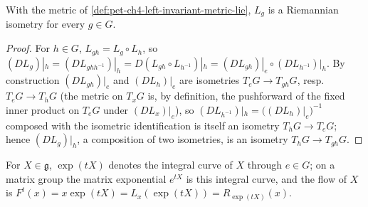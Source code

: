 \begin{proposition}
  \label{prop:pet-ch4-left-translation-isometry}
  \leanok
  With the metric of \cref{def:pet-ch4-left-invariant-metric-lie}, $L_g$ is a
  Riemannian isometry for every $g\in G$.
\end{proposition}
\begin{proof}
  \leanok
  For $h\in G$, $L_{gh}=L_g\circ L_h$, so
  $(DL_g)|_h=(DL_{ghh^{-1}})|_h=D(L_{gh}\circ L_{h^{-1}})|_h=(DL_{gh})|_e\circ(DL_{h^{-1}})|_h$.
  By construction $(DL_{gh})|_e$ and $(DL_h)|_e$ are isometries $T_eG\to T_{gh}G$,
  resp.\ $T_eG\to T_hG$ (the metric on $T_xG$ is, by definition, the pushforward
  of the fixed inner product on $T_eG$ under $(DL_x)|_e$), so
  $(DL_{h^{-1}})|_h=\big((DL_h)|_e\big)^{-1}$ composed with the isometric
  identification is itself an isometry $T_hG\to T_eG$; hence $(DL_g)|_h$, a
  composition of two isometries, is an isometry $T_hG\to T_{gh}G$.
\end{proof}

\begin{definition}
  \label{def:pet-ch4-lie-algebra-exp}
  \leanok
  For $X\in\mathfrak g$, $\exp(tX)$ denotes the integral curve of $X$ through
  $e\in G$; on a matrix group the matrix exponential $e^{tX}$ is this integral
  curve, and the flow of $X$ is $F^t(x)=x\exp(tX)=L_x(\exp(tX))=R_{\exp(tX)}(x)$.
\end{definition}

